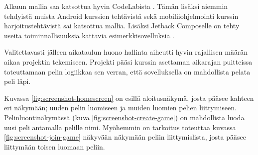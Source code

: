 Alkuun mallia saa katsottua hyvin CodeLabista
\parencite{AndroidDevelopersCodelabsComposeNavigation}. Tämän lisäksi aiemmin
tehdyistä muista Android kurssien tehtävistä sekä mobiliiohjelmointi kurssin
harjoitustehtävistä sai katsottua mallia. Lisäksi Jetback Composelle on tehty
useita toiminnallisuuksia kattavia esimerkkisovelluksia
\parencite{GithubAndroidComposeSamples}.

Valitettavasti jälleen aikataulun huono hallinta aiheutti hyvin rajallisen
määrän aikaa projektin tekemiseen. Projekti pääsi kurssin asettaman aikarajan
puitteissa toteuttamaan pelin logiikkaa sen verran, että sovelluksella on
mahdollista pelata peli läpi.

Kuvassa \ref{fig:screenshot-homescreen} on esillä aloitusnäkymä, josta pääsee
kahteen eri näkymään; uuden pelin luomiseen ja muiden luomien pelien
liittymiseen. Pelinluontinäkymässä (kuva \ref{fig:screenshot-create-game})
on mahdollista luoda uusi peli antamalla pelille nimi. Myöhemmin on tarkoitus
toteuttaa kuvassa \ref{fig:screenshot-join-game} näkyvään näkymään peliin
liittymislista, josta pääsee liittymään toisen luomaan peliin.

